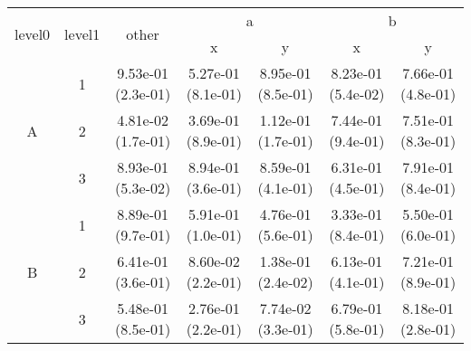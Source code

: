 \begin{tabular}{ccccccc}
\toprule
\multirow{2}{*}{level0} & \multirow{2}{*}{level1}& \multirow{2}{*}{other}&\multicolumn{2}{c}{a}&\multicolumn{2}{c}{b}\tabularnewline
\cmidrule(lr){4-5}
\cmidrule(lr){6-7}
&&&x&y&x&y\tabularnewline
\midrule
\multirow{3}{*}{A}&1& 9.53e-01 (2.3e-01)& 5.27e-01 (8.1e-01)& 8.95e-01 (8.5e-01)& 8.23e-01 (5.4e-02)& 7.66e-01 (4.8e-01)\tabularnewline
&2& 4.81e-02 (1.7e-01)& 3.69e-01 (8.9e-01)& 1.12e-01 (1.7e-01)& 7.44e-01 (9.4e-01)& 7.51e-01 (8.3e-01)\tabularnewline
&3& 8.93e-01 (5.3e-02)& 8.94e-01 (3.6e-01)& 8.59e-01 (4.1e-01)& 6.31e-01 (4.5e-01)& 7.91e-01 (8.4e-01)\tabularnewline
\midrule
\multirow{3}{*}{B}&1& 8.89e-01 (9.7e-01)& 5.91e-01 (1.0e-01)& 4.76e-01 (5.6e-01)& 3.33e-01 (8.4e-01)& 5.50e-01 (6.0e-01)\tabularnewline
&2& 6.41e-01 (3.6e-01)& 8.60e-02 (2.2e-01)& 1.38e-01 (2.4e-02)& 6.13e-01 (4.1e-01)& 7.21e-01 (8.9e-01)\tabularnewline
&3& 5.48e-01 (8.5e-01)& 2.76e-01 (2.2e-01)& 7.74e-02 (3.3e-01)& 6.79e-01 (5.8e-01)& 8.18e-01 (2.8e-01)\tabularnewline
\bottomrule
\end{tabular}
